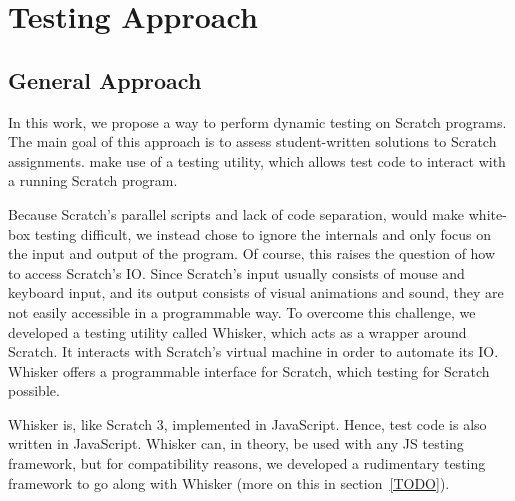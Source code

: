 
\chapter{Testing Approach}


\section{General Approach}

In this work, we propose a way to perform dynamic testing on Scratch programs.
The main goal of this approach is to assess student-written solutions to Scratch assignments.
make use of a testing utility, which allows test code to interact with a running Scratch program.

Because Scratch's parallel scripts and lack of code separation, would make white-box testing difficult,
we instead chose to ignore the internals and only focus on the input and output of the program.
Of course, this raises the question of how to access Scratch's IO.
Since Scratch's input usually consists of mouse and keyboard input, and its output consists of visual animations and sound,
they are not easily accessible in a programmable way.
To overcome this challenge, we developed a testing utility called Whisker, which acts as a wrapper around Scratch.
It interacts with Scratch's virtual machine in order to automate its IO.
Whisker offers a programmable interface for Scratch, which testing for Scratch possible.

Whisker is, like Scratch 3, implemented in JavaScript.
Hence, test code is also written in JavaScript.
Whisker can, in theory, be used with any JS testing framework,
but for compatibility reasons, we developed a rudimentary testing framework to go along with Whisker (more on this in section~\ref{TODO}).




